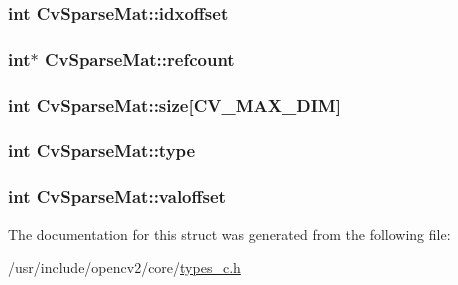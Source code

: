 \hypertarget{structCvSparseMat_a446eb308a725b00b2adb928be97b97e9}{
\subsubsection[{idxoffset}]{\setlength{\rightskip}{0pt plus 5cm}int Cv\-Sparse\-Mat\-::idxoffset}}\label{structCvSparseMat_a446eb308a725b00b2adb928be97b97e9}
\hypertarget{structCvSparseMat_a84c838139e344c8897754e129dda10af}{
\subsubsection[{refcount}]{\setlength{\rightskip}{0pt plus 5cm}int$\ast$ Cv\-Sparse\-Mat\-::refcount}}\label{structCvSparseMat_a84c838139e344c8897754e129dda10af}
\hypertarget{structCvSparseMat_a724bb060c7da45c00e9d3a2e2e0212f1}{
\subsubsection[{size}]{\setlength{\rightskip}{0pt plus 5cm}int Cv\-Sparse\-Mat\-::size\mbox{[}{\bf C\-V\-\_\-\-M\-A\-X\-\_\-\-D\-I\-M}\mbox{]}}}\label{structCvSparseMat_a724bb060c7da45c00e9d3a2e2e0212f1}
\hypertarget{structCvSparseMat_a14e4b63df7e0241a024b4a1e66abf5cf}{
\subsubsection[{type}]{\setlength{\rightskip}{0pt plus 5cm}int Cv\-Sparse\-Mat\-::type}}\label{structCvSparseMat_a14e4b63df7e0241a024b4a1e66abf5cf}
\hypertarget{structCvSparseMat_ae2894f3139e65d6d14faf1d815868a87}{
\subsubsection[{valoffset}]{\setlength{\rightskip}{0pt plus 5cm}int Cv\-Sparse\-Mat\-::valoffset}}\label{structCvSparseMat_ae2894f3139e65d6d14faf1d815868a87}


The documentation for this struct was generated from the following file\-:\begin{DoxyCompactItemize}
\item 
/usr/include/opencv2/core/\hyperlink{core_2types__c_8h}{types\-\_\-c.\-h}\end{DoxyCompactItemize}
